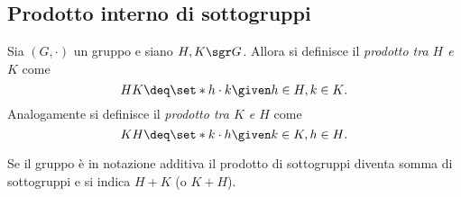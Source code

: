 \subsection{Prodotto interno di sottogruppi}

\begin{definition}
    Sia $(G, \cdot)$ un gruppo e siano $H,K \sgr G$. Allora si definisce il \emph{prodotto tra $H$ e $K$} come \begin{equation}
        HK \deq \set*{h\cdot k \given h \in H, k \in K}.
    \end{equation} Analogamente si definisce il \emph{prodotto tra $K$ e $H$} come \begin{equation}
        KH \deq \set*{k \cdot h \given k \in K, h \in H}.
    \end{equation}
\end{definition}

\begin{remark}
    Se il gruppo è in notazione additiva il prodotto di sottogruppi diventa somma di sottogruppi e si indica $H + K$ (o $K + H$).
\end{remark}


